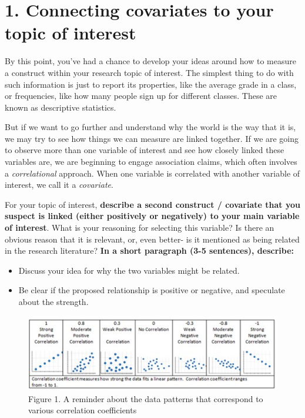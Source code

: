 \documentclass[
]{book}
\providecommand{\tightlist}{%
  \setlength{\itemsep}{0pt}\setlength{\parskip}{0pt}}
\begin{document}
\section*{1. Connecting covariates to your topic of interest}\label{connecting-covariates-to-your-topic-of-interest}

By this point, you've had a chance to develop your ideas around how to measure a construct within your research topic of interest. The simplest thing to do with such information is just to report its properties, like the average grade in a class, or frequencies, like how many people sign up for different classes. These are known as descriptive statistics.

But if we want to go further and understand why the world is the way that it is, we may try to see how things we can measure are linked together. If we are going to observe more than one variable of interest and see how closely linked these variables are, we are beginning to engage association claims, which often involves a \emph{correlational} approach. When one variable is correlated with another variable of interest, we call it a \emph{covariate}.

For your topic of interest, \textbf{describe a second construct / covariate that you suspect is linked (either positively or negatively) to your main variable of interest}. What is your reasoning for selecting this variable? Is there an obvious reason that it is relevant, or, even better- is it mentioned as being related in the research literature? \textbf{In a short paragraph (3-5 sentences), describe:}

\begin{itemize}
\tightlist
\item
  Discuss your idea for why the two variables might be related.
\item
  Be clear if the proposed relationship is positive or negative, and speculate about the strength.
\end{itemize}

\begin{figure}
\centering
\includegraphics{Figs/strength.jpg}
\caption{\label{fig:unnamed-chunk-1}Figure 1. A reminder about the data patterns that correspond to various correlation coefficients}
\end{figure}
\end{document}
